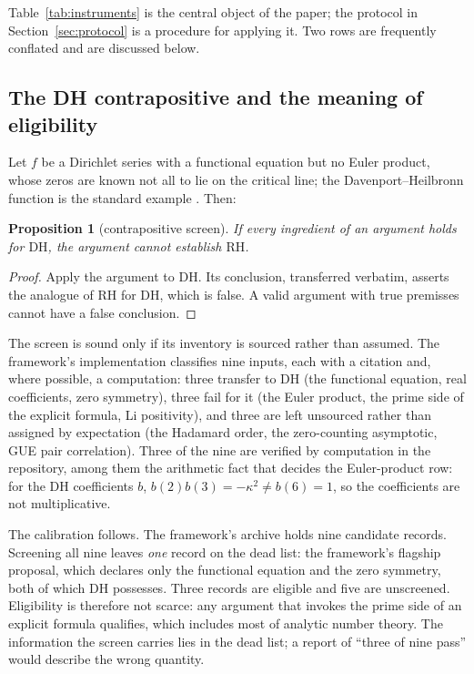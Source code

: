 \documentclass[11pt,a4paper]{article}
\newtheorem{proposition}{Proposition}
\newcommand{\RH}{\mathrm{RH}}
\newcommand{\DHf}{\mathrm{DH}}
\newcommand{\verdict}[1]{\textsf{#1}}
\begin{document}
Table~\ref{tab:instruments} is the central object of the paper; the protocol in
Section~\ref{sec:protocol} is a procedure for applying it. Two rows are frequently conflated and
are discussed below.

\subsection{The DH contrapositive and the meaning of eligibility}
\label{sec:calibration}

Let $f$ be a Dirichlet series with a functional equation but no Euler product, whose
zeros are known not all to lie on the critical line; the Davenport--Heilbronn function is the
standard example \cite{leclair,vorsos}. Then:

\begin{proposition}[contrapositive screen]
\label{prop:dh}
If every ingredient of an argument holds for $\DHf$, the argument cannot establish $\RH$.
\end{proposition}

\begin{proof}
Apply the argument to $\DHf$. Its conclusion, transferred verbatim, asserts the analogue of
$\RH$ for $\DHf$, which is false. A valid argument with true premisses cannot have a false
conclusion.
\end{proof}

The screen is sound only if its inventory is sourced rather than assumed. The
framework's implementation classifies nine inputs, each with a citation and, where possible, a
computation: three transfer to $\DHf$ (the functional equation, real coefficients, zero
symmetry), three fail for it (the Euler product, the prime side of the explicit formula, Li
positivity), and three are left unsourced rather than assigned by expectation (the Hadamard
order, the zero-counting asymptotic, GUE pair correlation). Three of the nine are verified by
computation in the repository, among them the arithmetic fact that decides the Euler-product row:
for the DH coefficients $b$, $b(2)b(3)=-\kappa^{2}\neq b(6)=1$, so the coefficients are not
multiplicative.

The calibration follows. The framework's archive holds nine candidate records. Screening
all nine leaves \emph{one} record on the dead list: the framework's flagship proposal, which
declares only the functional equation and the zero symmetry, both of which $\DHf$ possesses. Three
records are \verdict{eligible} and five are \verdict{unscreened}. Eligibility is therefore not
scarce: any argument that invokes the prime side of an explicit formula qualifies, which includes
most of analytic number theory. The information the screen carries lies in the dead list; a report
of ``three of nine pass'' would describe the wrong quantity.
\end{document}
